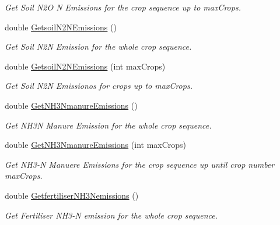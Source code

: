 \begin{DoxyCompactItemize}
\begin{DoxyCompactList}\small\item\em Get Soil N2O N Emissions for the crop sequence up to max\+Crops. \end{DoxyCompactList}\item 
\mbox{\label{class_crop_sequence_class_a5bd7053c09e78daefbaa5affdbf7071d}} 
double \mbox{\hyperlink{class_crop_sequence_class_a5bd7053c09e78daefbaa5affdbf7071d}{Getsoil\+N2\+N\+Emissions}} ()
\begin{DoxyCompactList}\small\item\em Get Soil N2N Emission for the whole crop sequence. \end{DoxyCompactList}\item 
double \mbox{\hyperlink{class_crop_sequence_class_aad5858d480c48cb5675a96d8a5e95e80}{Getsoil\+N2\+N\+Emissions}} (int max\+Crops)
\begin{DoxyCompactList}\small\item\em Get Soil N2N Emissionos for crops up to max\+Crops. \end{DoxyCompactList}\item 
\mbox{\label{class_crop_sequence_class_ae6d531161720a04116b3bff390c6c51e}} 
double \mbox{\hyperlink{class_crop_sequence_class_ae6d531161720a04116b3bff390c6c51e}{Get\+N\+H3\+Nmanure\+Emissions}} ()
\begin{DoxyCompactList}\small\item\em Get N\+H3N Manure Emission for the whole crop sequence. \end{DoxyCompactList}\item 
double \mbox{\hyperlink{class_crop_sequence_class_a7f13a7bbf89986c17605e4df01576abf}{Get\+N\+H3\+Nmanure\+Emissions}} (int max\+Crops)
\begin{DoxyCompactList}\small\item\em Get N\+H3-\/N Manuere Emissions for the crop sequence up until crop number max\+Crops. \end{DoxyCompactList}\item 
\mbox{\label{class_crop_sequence_class_ac9bf920b027d33d0ebc1d1a43e1b713e}} 
double \mbox{\hyperlink{class_crop_sequence_class_ac9bf920b027d33d0ebc1d1a43e1b713e}{Getfertiliser\+N\+H3\+Nemissions}} ()
\begin{DoxyCompactList}\small\item\em Get Fertiliser N\+H3-\/N emission for the whole crop sequence. \end{DoxyCompactList}\item 

\end{DoxyCompactItemize}
